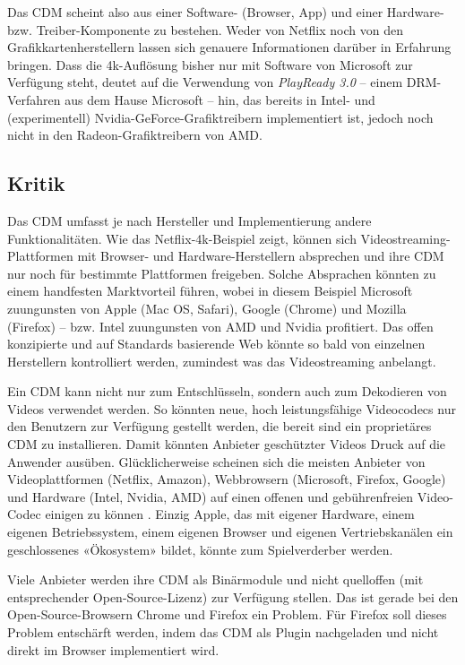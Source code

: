\documentclass[a4paper,11pt]{scrartcl}
\begin{document}
Das CDM scheint also aus einer Software- (Browser, App) und einer Hardware- bzw. Treiber-Komponente zu bestehen. Weder von Netflix noch von den Grafikkartenherstellern lassen sich genauere Informationen darüber in Erfahrung bringen. Dass die 4k-Auflösung bisher nur mit Software von Microsoft zur Verfügung steht, deutet auf die Verwendung von \textit{PlayReady 3.0} -- einem DRM-Verfahren aus dem Hause Microsoft -- hin, das bereits in Intel- und (experimentell) Nvidia-GeForce-Grafiktreibern implementiert ist, jedoch noch nicht in den Radeon-Grafiktreibern von AMD.


\subsection{Kritik}

Das CDM umfasst je nach Hersteller und Implementierung andere Funktionalitäten. Wie das Netflix-4k-Beispiel zeigt, können sich Videostreaming-Plattformen mit Browser- und Hardware-Herstellern absprechen und ihre CDM nur noch für bestimmte Plattformen freigeben. Solche Absprachen könnten zu einem handfesten Marktvorteil führen, wobei in diesem Beispiel Microsoft zuungunsten von Apple (Mac OS, Safari), Google (Chrome) und Mozilla (Firefox) -- bzw. Intel zuungunsten von AMD und Nvidia profitiert. Das offen konzipierte und auf Standards basierende Web könnte so bald von einzelnen Herstellern kontrolliert werden, zumindest was das Videostreaming anbelangt.

Ein CDM kann nicht nur zum Entschlüsseln, sondern auch zum Dekodieren von Videos verwendet werden. So könnten neue, hoch leistungsfähige Videocodecs nur den Benutzern zur Verfügung gestellt werden, die bereit sind ein proprietäres CDM zu installieren. Damit könnten Anbieter geschützter Videos Druck auf die Anwender ausüben. Glücklicherweise scheinen sich die meisten Anbieter von Videoplattformen (Netflix, Amazon), Webbrowsern (Microsoft, Firefox, Google) und Hardware (Intel, Nvidia, AMD) auf einen offenen und gebührenfreien Video-Codec einigen zu können \cite{aomedia}. Einzig Apple, das mit eigener Hardware, einem eigenen Betriebssystem, einem eigenen Browser und eigenen Vertriebskanälen ein geschlossenes «Ökosystem» bildet, könnte zum Spielverderber werden.

Viele Anbieter werden ihre CDM als Binärmodule und nicht quelloffen (mit entsprechender Open-Source-Lizenz) zur Verfügung stellen. Das ist gerade bei den Open-Source-Browsern Chrome und Firefox ein Problem. Für Firefox soll dieses Problem entschärft werden, indem das CDM als Plugin nachgeladen und nicht direkt im Browser implementiert wird.
\end{document}

